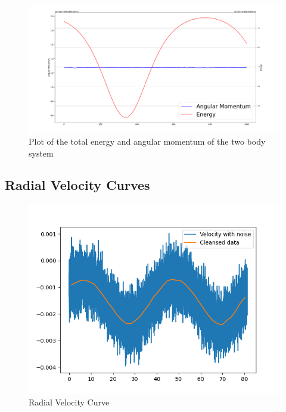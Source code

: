 \documentclass[reprint,english,notitlepage]{revtex4-2}
\begin{document}
	\begin{figure}[h!]
	  \centering
	  \includegraphics[scale = .15]{Figures/Energy_AngularMomentum_plot.pdf}
	  \caption{Plot of the total energy and angular momentum of the two body system}
	  \label{fig: tot_Energy_AM}
	\end{figure}
	
	
	\subsection{Radial Velocity Curves}	
		\begin{figure}[h!]
			\centering
			\includegraphics[scale = .5]{Figures/Other_Group_Radial_Velocity}
			\caption{Radial Velocity Curve}
			\label{fig: Radial Velocity}
		\end{figure}
\end{document}
